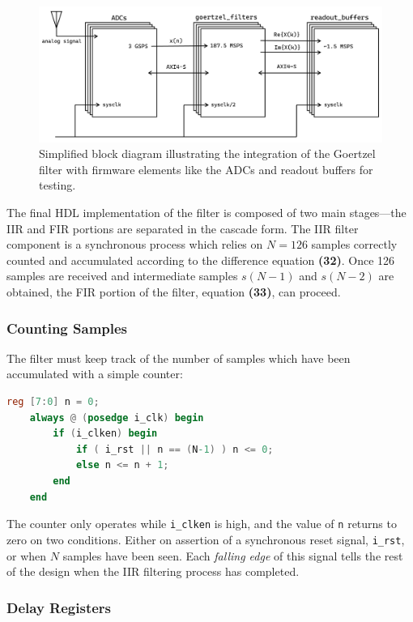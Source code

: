 \documentclass[reprint,amsmath,amssymb,aps,pra]{revtex4-2}
\begin{document}
\begin{figure}
    \centering
    \includegraphics[width=\linewidth]{figs/bd_goertzel_simple.png}
    \caption{Simplified block diagram illustrating the integration of the Goertzel filter with firmware elements like the ADCs and readout buffers for testing.}
    \label{fig:blockdiag2}
\end{figure}

The final HDL implementation of the filter is composed of two main stages---the IIR and FIR portions are separated in the cascade form. The IIR filter component is a synchronous process which relies on $N = 126$ samples correctly counted and accumulated according to the difference equation \textbf{(32)}. Once 126 samples are received and intermediate samples $s(N-1)$ and $s(N-2)$ are obtained, the FIR portion of the filter, equation \textbf{(33)}, can proceed.

\subsubsection{Counting Samples}
The filter must keep track of the number of samples which have been accumulated with a simple counter:
\begin{lstlisting}[language=Verilog]
    reg [7:0] n = 0;
    always @ (posedge i_clk) begin
        if (i_clken) begin
            if ( i_rst || n == (N-1) ) n <= 0;
            else n <= n + 1;
        end
    end
\end{lstlisting}

The counter only operates while \verb|i_clken| is high, and the value of \verb|n| returns to zero on two conditions. Either on assertion of a synchronous reset signal, \verb|i_rst|, or when $N$ samples have been seen. Each \textit{falling edge} of this signal tells the rest of the design when the IIR filtering process has completed.

\subsubsection{Delay Registers}
\end{document}
